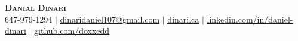 \begin{center}
    \textbf{\Huge \scshape Danial Dinari} \\ \vspace{1pt}
    \small 647-979-1294 $|$ 
    \href{mailto:dinaridaniel107@gmail.com}{\underline{dinaridaniel107@gmail.com}} $|$ 
    \href{https://dinari.ca/}{\underline{dinari.ca}} $|$
    \href{https://www.linkedin.com/in/daniel-dinari/}{\underline{linkedin.com/in/daniel-dinari}} $|$
    \href{https://github.com/doxxedd}{\underline{github.com/doxxedd}}
\end{center}